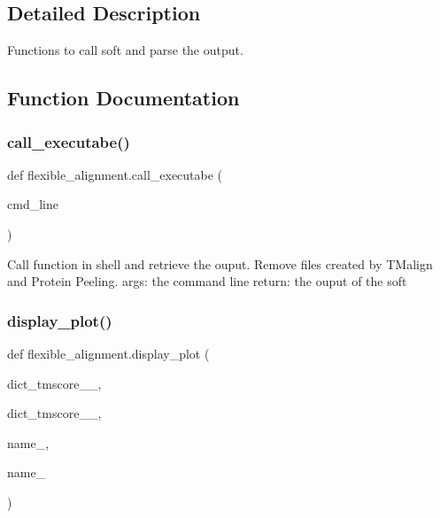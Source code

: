 \subsection{Detailed Description}
\begin{DoxyVerb}Functions to call soft and parse the output.
\end{DoxyVerb}
 

\subsection{Function Documentation}
\mbox{\label{namespaceflexible__alignment_a12ec477a3dff498a3a02a7ff3aa538fa}} 
\subsubsection{\texorpdfstring{call\+\_\+executabe()}{call\_executabe()}}
{\footnotesize\ttfamily def flexible\+\_\+alignment.\+call\+\_\+executabe (\begin{DoxyParamCaption}\item[{}]{cmd\+\_\+line }\end{DoxyParamCaption})}

\begin{DoxyVerb}Call function in shell and retrieve the ouput. Remove files created by
TMalign and Protein Peeling.
args:
    the command line
return:
    the ouput of the soft
\end{DoxyVerb}
 \mbox{\label{namespaceflexible__alignment_a4cd4b0ab22694508394f1d173cf2adf3}} 
\subsubsection{\texorpdfstring{display\+\_\+plot()}{display\_plot()}}
{\footnotesize\ttfamily def flexible\+\_\+alignment.\+display\+\_\+plot (\begin{DoxyParamCaption}\item[{}]{dict\+\_\+tmscore\+\_\+\_,  }\item[{}]{dict\+\_\+tmscore\+\_\+\_,  }\item[{}]{name\+\_,  }\item[{}]{name\+\_ }\end{DoxyParamCaption})}

